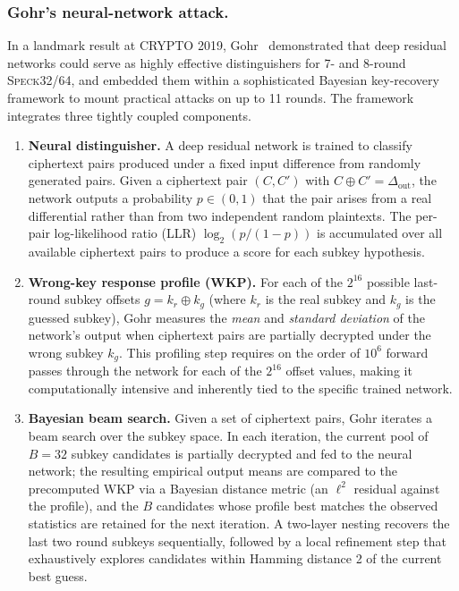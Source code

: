 \documentclass[runningheads]{llncs}
\newcommand{\speck}{\textsc{Speck}32/64}
\newcommand{\xor}{\oplus}
\begin{document}
\subsubsection{Gohr's neural-network attack.}
In a landmark result at CRYPTO 2019, Gohr~\cite{Goh19} demonstrated
that deep residual networks could serve as highly effective
distinguishers for 7- and 8-round \speck{}, and embedded them within a
sophisticated Bayesian key-recovery framework to mount practical attacks
on up to 11 rounds.  The framework integrates three tightly coupled
components.

\begin{enumerate}
  \item \textbf{Neural distinguisher.}  A deep residual network is
    trained to classify ciphertext pairs produced under a fixed input
    difference from randomly generated pairs.  Given a ciphertext pair
    $(C, C')$ with $C \xor C' = \Delta_{\mathrm{out}}$, the network
    outputs a probability $p \in (0,1)$ that the pair arises from a
    real differential rather than from two independent random
    plaintexts.  The per-pair log-likelihood ratio (LLR)
    $\log_2(p/(1-p))$ is accumulated over all available ciphertext
    pairs to produce a score for each subkey hypothesis.

  \item \textbf{Wrong-key response profile (WKP).}  For each of the
    $2^{16}$ possible last-round subkey offsets $g = k_r \xor k_g$
    (where $k_r$ is the real subkey and $k_g$ is the guessed subkey),
    Gohr measures the \emph{mean} and \emph{standard deviation} of the
    network's output when ciphertext pairs are partially decrypted
    under the wrong subkey $k_g$.  This profiling step requires on the
    order of $10^6$ forward passes through the network for each of the
    $2^{16}$ offset values, making it computationally intensive and
    inherently tied to the specific trained network.

  \item \textbf{Bayesian beam search.}  Given a set of ciphertext
    pairs, Gohr iterates a beam search over the subkey space.  In each
    iteration, the current pool of $B = 32$ subkey candidates is
    partially decrypted and fed to the neural network; the resulting
    empirical output means are compared to the precomputed WKP via a
    Bayesian distance metric (an $\ell^2$ residual against the profile),
    and the $B$ candidates whose profile best matches the observed
    statistics are retained for the next iteration.  A two-layer
    nesting recovers the last two round subkeys sequentially, followed
    by a local refinement step that exhaustively explores candidates
    within Hamming distance 2 of the current best guess.
\end{enumerate}
\end{document}
